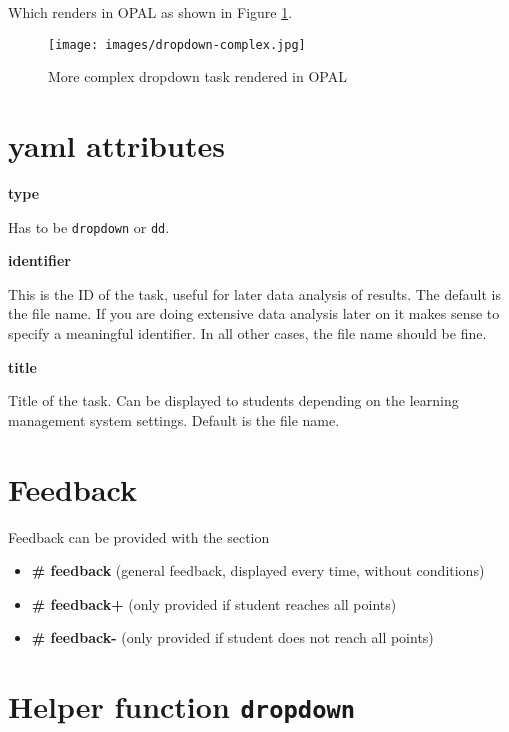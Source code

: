 \documentclass[twoside]{tufte-book}
\providecommand{\tightlist}{%
  \setlength{\itemsep}{0pt}\setlength{\parskip}{0pt}}
\begin{document}
Which renders in OPAL as shown in Figure \ref{dd2opal}.

\begin{figure}
\centering
\texttt{[image: images/dropdown-complex.jpg]}
\caption{\label{dd2opal}More complex dropdown task rendered in OPAL}
\end{figure}

\section{yaml attributes}\label{yaml-attributes-3}

\noindent\textbf{type}\label{type-3}

Has to be \texttt{dropdown} or \texttt{dd}.

\noindent\textbf{identifier}\label{identifier-3}

This is the ID of the task, useful for later data analysis of results. The default is the file name. If you are doing extensive data analysis later on it makes sense to specify a meaningful identifier. In all other cases, the file name should be fine.

\noindent\textbf{title}\label{title-3}

Title of the task. Can be displayed to students depending on the learning management system settings. Default is the file name.

\section{Feedback}\label{feedback-3}

Feedback can be provided with the section

\begin{itemize}
\tightlist
\item
  \textbf{\# feedback} (general feedback, displayed every time, without conditions)
\item
  \textbf{\# feedback+} (only provided if student reaches all points)
\item
  \textbf{\# feedback-} (only provided if student does not reach all points)
\end{itemize}

\section{\texorpdfstring{Helper function \texttt{dropdown}}{Helper function dropdown}}\label{helper-function-dropdown}
\end{document}
